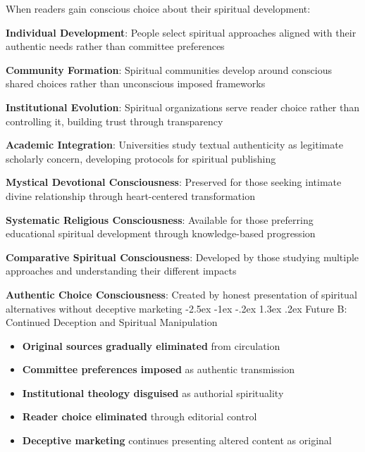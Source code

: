 \documentclass[12pt,twoside]{book}
\makeatletter
\renewcommand\section{\@startsection{section}{1}{\z@}%
{-2.5ex \@plus -1ex \@minus -.2ex}%
{1.3ex \@plus.2ex}%
{\normalfont\Large\bfseries}}
\makeatother
\begin{document}
When readers gain conscious choice about their spiritual development:

\textbf{\textbf{Individual Development}}: People select spiritual approaches aligned with their authentic needs rather than committee preferences

\textbf{\textbf{Community Formation}}: Spiritual communities develop around conscious shared choices rather than unconscious imposed frameworks

\textbf{\textbf{Institutional Evolution}}: Spiritual organizations serve reader choice rather than controlling it, building trust through transparency

\textbf{\textbf{Academic Integration}}: Universities study textual authenticity as legitimate scholarly concern, developing protocols for spiritual publishing

\textbf{\textbf{Mystical Devotional Consciousness}}: Preserved for those seeking intimate divine relationship through heart-centered transformation

\textbf{\textbf{Systematic Religious Consciousness}}: Available for those preferring educational spiritual development through knowledge-based progression

\textbf{\textbf{Comparative Spiritual Consciousness}}: Developed by those studying multiple approaches and understanding their different impacts

\textbf{\textbf{Authentic Choice Consciousness}}: Created by honest presentation of spiritual alternatives without deceptive marketing
\section{Future B: Continued Deception and Spiritual Manipulation}
\label{sec:org48528f0}

\begin{itemize}
\item \textbf{\textbf{Original sources gradually eliminated}} from circulation
\item \textbf{\textbf{Committee preferences imposed}} as authentic transmission
\item \textbf{\textbf{Institutional theology disguised}} as authorial spirituality
\item \textbf{\textbf{Reader choice eliminated}} through editorial control
\item \textbf{\textbf{Deceptive marketing}} continues presenting altered content as original
\end{itemize}
\end{document}
